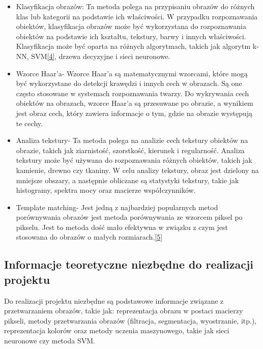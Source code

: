 \documentclass[a4paper, titleauthor]{mwart}
\begin{document}
\begin{itemize}
    \item Klasyfikacja obrazów: Ta metoda polega na przypisaniu obrazów do różnych klas lub kategorii na podstawie ich właściwości. W przypadku rozpoznawania obiektów, klasyfikacja obrazów może być wykorzystana do rozpoznawania obiektów na podstawie ich kształtu, tekstury, barwy i innych właściwości. Klasyfikacja może być oparta na różnych algorytmach, takich jak algorytm k-NN, SVM\hyperref[4]{[4]}, drzewa decyzyjne i sieci neuronowe.
\newline
    \item Wzorce Haar'a- Wzorce Haar'a są matematycznymi wzorcami, które mogą być wykorzystane do detekcji krawędzi i innych cech w obrazach.  Są one często stosowane w systemach rozpoznawania twarzy. Do wykrywania cech obiektów na obrazach, wzorce Haar'a są przesuwane po obrazie, a wynikiem jest obraz cech, który zawiera informacje o tym, gdzie na obrazie występują te cechy.
\newline
    \item Analiza tekstury- Ta metoda polega na analizie cech tekstury obiektów na obrazie, takich jak ziarnistość, szorstkość, kierunek i regularność. Analiza tekstury może być używana do rozpoznawania różnych obiektów, takich jak kamienie, drewno czy tkaniny. W celu analizy tekstury, obraz jest dzielony na mniejsze obszary, a następnie obliczane są statystyki tekstury, takie jak histogramy, spektra mocy oraz macierze współczynników.
\newline 
    \item Template matching- Jest jedną z najbardziej popularnych metod porównywania obrazów jest metoda porównywania ze wzorcem piksel po pikselu. Jest to metoda dość mało efektywna w związku z czym jest stosowana do obrazów o małych rozmiarach.\hyperref[5]{[5]}
\newline
\end{itemize}

\subsection{Informacje teoretyczne niezbędne do realizacji projektu}
Do realizacji projektu niezbędne są podstawowe informacje związane z przetwarzaniem obrazów, takie jak: reprezentacja obrazu w postaci macierzy pikseli, metody przetwarzania obrazów (filtracja, segmentacja, wyostrzanie, itp.), reprezentacja kolorów oraz metody uczenia maszynowego, takie jak sieci neuronowe czy metoda SVM.
\end{document}
